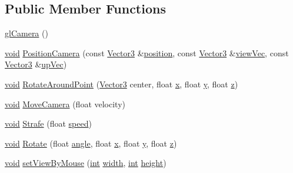 \subsection*{Public Member Functions}
\begin{DoxyCompactItemize}
\item 
\hyperlink{classgl_camera_a8339c3cd03f2c15ea28cc4f7d473d3cd}{gl\+Camera} ()
\item 
\hyperlink{wglext_8h_a9e6b7f1933461ef318bb000d6bd13b83}{void} \hyperlink{classgl_camera_aefdc27e4f845a5c3610044c78068f802}{Position\+Camera} (const \hyperlink{class_vector3}{Vector3} \&\hyperlink{classgl_camera_a4e7a84b7ccc0840f436d9792c5429c2b}{position}, const \hyperlink{class_vector3}{Vector3} \&\hyperlink{classgl_camera_a2d6263fab021ec81f9f13582f8bdcb9b}{view\+Vec}, const \hyperlink{class_vector3}{Vector3} \&\hyperlink{classgl_camera_a361375f29cfc87acae069ec5b45f56f4}{up\+Vec})
\item 
\hyperlink{wglext_8h_a9e6b7f1933461ef318bb000d6bd13b83}{void} \hyperlink{classgl_camera_ad14659710098d9f0db8211c7681243b7}{Rotate\+Around\+Point} (\hyperlink{class_vector3}{Vector3} center, float \hyperlink{glext_8h_ad77deca22f617d3f0e0eb786445689fc}{x}, float \hyperlink{glext_8h_a9298c7ad619074f5285b32c6b72bfdea}{y}, float \hyperlink{glext_8h_a1483160fae141afea848a5393c286b2b}{z})
\item 
\hyperlink{wglext_8h_a9e6b7f1933461ef318bb000d6bd13b83}{void} \hyperlink{classgl_camera_ac5785ab7420408b165ad7a48aaab1a3a}{Move\+Camera} (float velocity)
\item 
\hyperlink{wglext_8h_a9e6b7f1933461ef318bb000d6bd13b83}{void} \hyperlink{classgl_camera_a31b34555bdea70f380fe6810b6be24ed}{Strafe} (float \hyperlink{classgl_camera_a78fc5959743b15b58b90fb747642fee2}{speed})
\item 
\hyperlink{wglext_8h_a9e6b7f1933461ef318bb000d6bd13b83}{void} \hyperlink{classgl_camera_a72ee7df8a391d2ce1be6cc997131143f}{Rotate} (float \hyperlink{glext_8h_a9e06c1f76a20fed54ca742cd25cb02c4}{angle}, float \hyperlink{glext_8h_ad77deca22f617d3f0e0eb786445689fc}{x}, float \hyperlink{glext_8h_a9298c7ad619074f5285b32c6b72bfdea}{y}, float \hyperlink{glext_8h_a1483160fae141afea848a5393c286b2b}{z})
\item 
\hyperlink{wglext_8h_a9e6b7f1933461ef318bb000d6bd13b83}{void} \hyperlink{classgl_camera_ab5c79ab0c78257e824f10bef3efbf61a}{set\+View\+By\+Mouse} (\hyperlink{wglext_8h_a500a82aecba06f4550f6849b8099ca21}{int} \hyperlink{glext_8h_aa105b18f96e6bc2485cb7f576a7fb9ba}{width}, \hyperlink{wglext_8h_a500a82aecba06f4550f6849b8099ca21}{int} \hyperlink{glext_8h_aa214bd63e12f7ddf524c83894fcc69a7}{height})

\end{DoxyCompactItemize}
